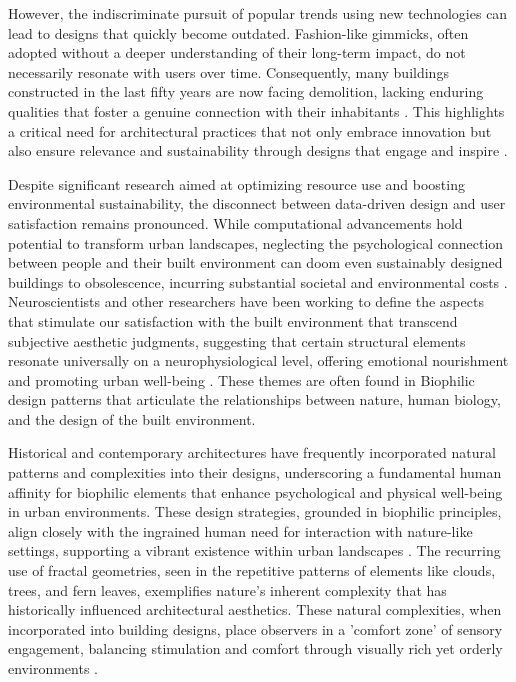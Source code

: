 
However, the indiscriminate pursuit of popular trends using new technologies can lead to designs that quickly become outdated.
Fashion-like gimmicks, often adopted without a deeper understanding of their long-term impact, do not necessarily resonate with users over time.
Consequently, many buildings constructed in the last fifty years are now facing demolition, lacking enduring qualities that foster a genuine connection with their inhabitants \cite{Aesthetic2022}.
This highlights a critical need for architectural practices that not only embrace innovation but also ensure relevance and sustainability through designs that engage and inspire \cite{Brielmann2022}.

Despite significant research aimed at optimizing resource use and boosting environmental sustainability, the disconnect between data-driven design and user satisfaction remains pronounced.
While computational advancements hold potential to transform urban landscapes, neglecting the psychological connection between people and their built environment can doom even sustainably designed buildings to obsolescence, incurring substantial societal and environmental costs \cite{Aesthetic2022}.
Neuroscientists and other researchers have been working to define the aspects that stimulate our satisfaction with the built environment that transcend subjective aesthetic judgments, suggesting that certain structural elements resonate universally on a neurophysiological level, offering emotional nourishment and promoting urban well-being \cite{Brielmann2022}.
These themes are often found in Biophilic design patterns that articulate the relationships between nature, human biology, and the design of the built environment.

Historical and contemporary architectures have frequently incorporated natural patterns and complexities into their designs, underscoring a fundamental human affinity for biophilic elements that enhance psychological and physical well-being in urban environments.
These design strategies, grounded in biophilic principles, align closely with the ingrained human need for interaction with nature-like settings, supporting a vibrant existence within urban landscapes \cite{Browning2014}.
The recurring use of fractal geometries, seen in the repetitive patterns of elements like clouds, trees, and fern leaves, exemplifies nature's inherent complexity that has historically influenced architectural aesthetics.
These natural complexities, when incorporated into building designs, place observers in a 'comfort zone' of sensory engagement, balancing stimulation and comfort through visually rich yet orderly environments \cite{Browning2014}.

